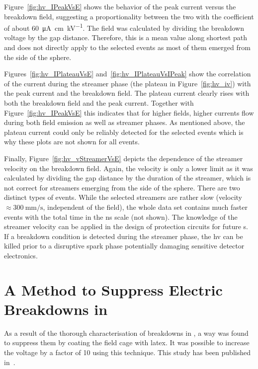 Figure~\ref{fig:hv_IPeakVsE} shows the behavior of the peak current versus the breakdown field, suggesting a proportionality between the two with the coefficient of about \SI{60}{\micro\ampere\centi\metre\per\kilo\volt}.
The field was calculated by dividing the breakdown voltage by the gap distance.
Therefore, this is a mean value along shortest path and does not directly apply to the selected events as most of them emerged from the side of the sphere.

Figures~\ref{fig:hv_IPlateauVsE} and~\ref{fig:hv_IPlateauVsIPeak} show the correlation of the current during the streamer phase (the plateau in Figure~\ref{fig:hv_iv}) with the peak current and the breakdown field.
The plateau current clearly rises with both the breakdown field and the peak current.
Together with Figure~\ref{fig:hv_IPeakVsE} this indicates that for higher fields, higher currents flow during both field emission as well as streamer phases.
As mentioned above, the plateau current could only be reliably detected for the selected events which is why these plots are not shown for all events.

Finally, Figure~\ref{fig:hv_vStreamerVsE} depicts the dependence of the streamer velocity on the breakdown field.
Again, the velocity is only a lower limit as it was calculated by dividing the gap distance by the duration of the streamer, which is not correct for streamers emerging from the side of the sphere.
There are two distinct types of events.
While the selected streamers are rather slow (velocity $\approx \SI{300}{\milli\metre\per\second}$, independent of the field), the whole data set contains much faster events with the total time in the ns scale (not shown).
The knowledge of the streamer velocity can be applied in the design of protection circuits for future \lartpc{}s.
If a breakdown condition is detected during the streamer phase, the \gls{hv} can be killed prior to a disruptive spark phase potentially damaging sensitive detector electronics.


\section{A Method to Suppress Electric Breakdowns in }
\label{sec:studies_latex}

As a result of the thorough characterisation of breakdowns in \lar{}, a way was found to suppress them by coating the field cage with latex.
It was possible to increase the voltage by a factor of \num{10} using this technique.
This study has been published in~\cite{latex}.

